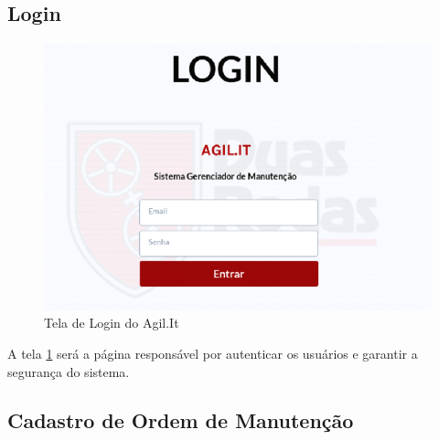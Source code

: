 {	
	\subsection{Login}
	
	\begin{figure}[htb]
		\caption{\label{web_login}Tela de Login do Agil.It}
		\begin{center}
			\includegraphics[scale=0.70]{./Figuras/web/login.png}
		\end{center}
	\end{figure}
	
	A tela \ref{web_login} será a página responsável por autenticar os usuários e garantir a segurança do sistema.
	
	
	\subsection{Cadastro de Ordem de Manutenção}
	
}
